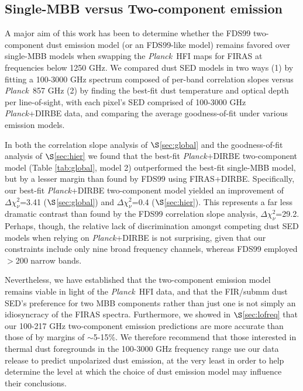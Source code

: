 \documentclass{emulateapj}
\newcommand{\PLANCK}{{\it Planck}}
\begin{document}
\subsection{Single-MBB versus Two-component emission}
A major aim of this work has been to determine whether the  FDS99 
two-component dust emission model (or an FDS99-like model) remains favored over
single-MBB models when swapping the \PLANCK~HFI maps for FIRAS at frequencies 
below 1250 GHz. We compared dust SED models in two ways (1) by fitting a 
100-3000 GHz spectrum composed of per-band correlation slopes versus 
\PLANCK~857 GHz (2) by finding the best-fit dust temperature and optical depth
per line-of-sight, with each pixel's SED comprised of 100-3000 GHz 
\PLANCK+DIRBE data, and comparing the average goodness-of-fit under various
emission models.

In both the correlation slope analysis of $\S$\ref{sec:global} and the 
goodness-of-fit analysis of $\S$\ref{sec:hier} we found that the 
best-fit \PLANCK+DIRBE two-component model (Table \ref{tab:global}, model 2) 
outperformed the best-fit single-MBB model, but by a lesser margin than found 
by FDS99 using FIRAS+DIRBE. Specifically, our best-fit \PLANCK+DIRBE 
two-component model yielded an improvement of $\Delta \chi^2_{\nu}$=3.41 
($\S$\ref{sec:global}) and $\Delta \chi^2_{\nu}$=0.4 ($\S$\ref{sec:hier}). This
represents a far less dramatic contrast than found by the FDS99 correlation 
slope analysis, $\Delta \chi^2_{\nu}$=29.2. Perhaps, though, the relative lack 
of discrimination amongst competing dust SED models when relying on 
\PLANCK+DIRBE is not surprising, given that our constraints include only nine 
broad frequency channels, whereas FDS99 employed $>$200 narrow bands.


Nevertheless, we have established that the two-component emission model
remains viable in light of the \PLANCK~HFI data, and that the FIR/submm 
dust SED's preference for two MBB components rather than just one is not
simply an idiosyncracy of the FIRAS spectra. Furthermore, we showed in 
$\S$\ref{sec:lofreq} that our 100-217 GHz two-component emission predictions
are more accurate than those of \cite{planckdust} by margins of $\sim$5-15\%.
We therefore recommend that those interested in thermal dust foregrounds in 
the 100-3000 GHz frequency range use our data release to predict unpolarized 
dust emission, at the very least in order to help determine the level at which 
the choice of dust emission model may influence their conclusions.
\end{document}
